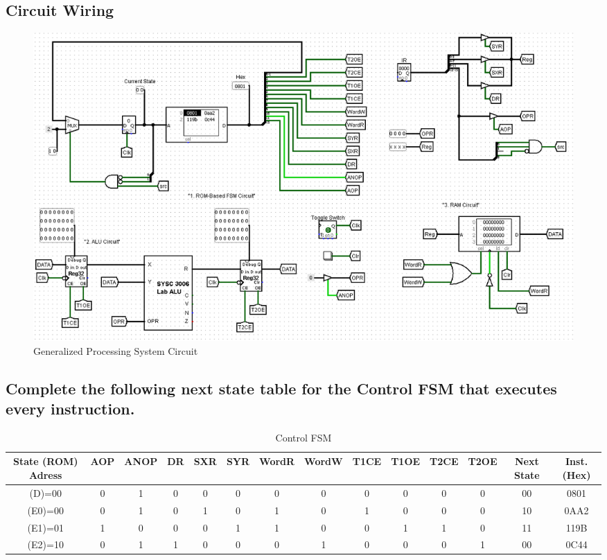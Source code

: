 \documentclass{article}
\begin{document}
		\subsection{Circuit Wiring}
		\begin{figure}[!h]
			\centering
			\includegraphics[width=\linewidth]{generalized_processing_system_circuit.png}
			\caption{Generalized Processing System Circuit}
		\end{figure}

		\subsection{Complete the following next state table for the Control FSM that executes every instruction.}
		\begin{table}[!h]
			\centering
			\setlength\tabcolsep{2pt}
			\caption{Control FSM}
			\vspace{0.2cm}	 
			\begin{tabular}{|c|c|c|c|c|c|c|c|c|c|c|c|c|c|}
				\hline
				State (ROM) Adress & AOP & ANOP & DR & SXR & SYR & WordR & WordW & T1CE & T1OE & T2CE & T2OE & Next State & Inst.(Hex)\\
				\hline\hline
				(D)=00 & 0 & 1 & 0 & 0 & 0 & 0 & 0 & 0 & 0 & 0 & 0 & 00 & 0801\\
				\hline
				(E0)=00 & 0 & 1 & 0 & 1 & 0 & 1 & 0 & 1 & 0 & 0 & 0 & 10 & 0AA2\\
				\hline
				(E1)=01 & 1 & 0 & 0 & 0 & 1 & 1 & 0 & 0 & 1 & 1 & 0 & 11 & 119B\\
				\hline
				(E2)=10 & 0 & 1 & 1 & 0 & 0 & 0 & 1 & 0 & 0 & 0 & 1 & 00 & 0C44\\
				\hline
			\end{tabular}
		\end{table}

		\pagebreak
\end{document}
